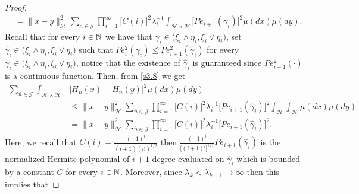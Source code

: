 \documentclass[review, onefignum, onetabnum]{siamart171218}
\begin{document}
\begin{proof}
\begin{equation}
\begin{aligned}
        &=
        \| x-y\|_{\mathcal{H}}^2
        \sum_{\bar n\in \mathcal{J}}
            \prod_{i=1}^\infty
                \Big[
                    C(i)
                \Big]^2
                \lambda_i^{-1}
                \int_{\mathcal{H}\times \mathcal{H}}
                    \Big[
                        Pe_{i+1}(\gamma_i)
                    \Big]^2
                \mu(dx)\mu(dy) .
    \end{aligned}
\end{equation}
Recall that for every $i \in {\mathbb N}$ we have that 
$
    \gamma_i\in
    \big(
        \xi_i \wedge\eta_i, \xi_i\vee \eta_i  
   \big)
$, set 
$
    \hat \gamma_i
    \in 
    \big(
        \xi_i \wedge \eta_i,
        \xi_i\vee \eta_i  
    \big)
$ such that
$
    Pe_i^2(\gamma_i)
    \le Pe_{i+1}^2(\hat\gamma_i)
$ for every
$
    \gamma_i
    \in 
    \big(
        \xi_i \wedge\eta_i, 
        \xi_i \vee
        \eta_i
    \big)
$, notice that the
existence of $\hat \gamma_i$ is
guaranteed since $Pe_{i+1}^2(\cdot)$ 
is a continuous function. Then, from
\eqref{s3.8} we get
\begin{equation}
    \label{s3.9}
    \begin{aligned}
        \sum_{\bar n\in \mathcal{J}}
        \int_{\mathcal{H}\times \mathcal{H}}
        &
        \big|
            H_{\bar n}(x) - H_{\bar n}(y)
        \big|^2
        \mu(dx)\mu(dy)
        \\
        &\le
        \| x-y\|_{\mathcal{H}}^2
        \sum_{\bar n\in \mathcal{J}}
            \prod_{i=1}^\infty
            \Big[
                C(i)
            \Big]^2
            \lambda_i^{-1}
            \Big[
                Pe_{i+1}(\hat \gamma_i)
            \Big]^2
            \int_{\mathcal{H}}
            \int_{\mathcal{H}}
            \mu(dx)\mu(dy)
        \\
        &=
        \| x-y\|_{\mathcal{H}}^2
        \sum_{\bar n\in \mathcal{J}}
            \prod_{i=1}^\infty
            \Big[
                C(i)
            \Big]^2
            \lambda_i^{-1}
            \Big[
                Pe_{i+1}(\hat \gamma_i)
            \Big]^2 .
    \end{aligned}
\end{equation}
Here, we recall that $C(i)=\frac{(-1)^i}{(i+1)(i!)^{1/2}} $ then
$\frac{(-1)^i}{\big[(i+1)!\Big]^{1/2}} Pe_{i+1}(\hat \gamma_i)$
is the normalized Hermite polynomial of $i+1$ degree evaluated on
$\hat \gamma_i$ which is bounded by a constant $C$ for every $i\in{\mathbb N}$.
Moreover, since $\lambda_k<\lambda_{k+1}\rightarrow \infty $
then this implies that

\end{proof}
\end{document}
